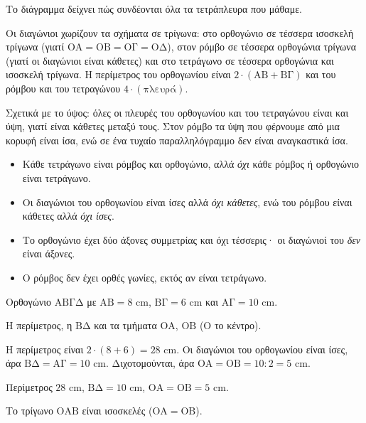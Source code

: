 Το διάγραμμα δείχνει πώς συνδέονται όλα τα τετράπλευρα που μάθαμε.

\begin{center}
\end{center}

Οι διαγώνιοι χωρίζουν τα σχήματα σε τρίγωνα: στο ορθογώνιο σε τέσσερα ισοσκελή τρίγωνα (γιατί $\mathrm{ΟΑ}=\mathrm{ΟΒ}=\mathrm{ΟΓ}=\mathrm{ΟΔ}$), στον ρόμβο σε τέσσερα ορθογώνια τρίγωνα (γιατί οι διαγώνιοι είναι κάθετες) και στο τετράγωνο σε τέσσερα ορθογώνια και ισοσκελή τρίγωνα. Η περίμετρος του ορθογωνίου είναι $2\cdot(\mathrm{ΑΒ}+\mathrm{ΒΓ})$ και του ρόμβου και του τετραγώνου $4\cdot(\text{πλευρά})$.

Σχετικά με το ύψος: όλες οι πλευρές του ορθογωνίου και του τετραγώνου είναι και ύψη, γιατί είναι κάθετες μεταξύ τους. Στον ρόμβο τα ύψη που φέρνουμε από μια κορυφή είναι ίσα, ενώ σε ένα τυχαίο παραλληλόγραμμο δεν είναι αναγκαστικά ίσα.

\begin{prosoxi}
\begin{itemize}[leftmargin=1.2em,itemsep=0.3ex,topsep=2pt]
\item Κάθε τετράγωνο είναι ρόμβος και ορθογώνιο, αλλά \emph{όχι} κάθε ρόμβος ή ορθογώνιο είναι τετράγωνο.
\item Οι διαγώνιοι του ορθογωνίου είναι ίσες αλλά \emph{όχι κάθετες}, ενώ του ρόμβου είναι κάθετες αλλά \emph{όχι ίσες}.
\item Το ορθογώνιο έχει δύο άξονες συμμετρίας και όχι τέσσερις· οι διαγώνιοί του \emph{δεν} είναι άξονες.
\item Ο ρόμβος δεν έχει ορθές γωνίες, εκτός αν είναι τετράγωνο.
\end{itemize}
\end{prosoxi}


\tixero Ορθογώνιο $\mathrm{ΑΒΓΔ}$ με $\mathrm{ΑΒ}=8$ cm, $\mathrm{ΒΓ}=6$ cm και $\mathrm{ΑΓ}=10$ cm.\par
\tithelo Η περίμετρος, η $\mathrm{ΒΔ}$ και τα τμήματα $\mathrm{ΟΑ}$, $\mathrm{ΟΒ}$ ($\mathrm{Ο}$ το κέντρο).\par
\possindeo Η περίμετρος είναι $2\cdot(8+6)=28$ cm. Οι διαγώνιοι του ορθογωνίου είναι ίσες, άρα $\mathrm{ΒΔ}=\mathrm{ΑΓ}=10$ cm. Διχοτομούνται, άρα $\mathrm{ΟΑ}=\mathrm{ΟΒ}=10:2=5$ cm.\par
\apantisi Περίμετρος $28$ cm, $\mathrm{ΒΔ}=10$ cm, $\mathrm{ΟΑ}=\mathrm{ΟΒ}=5$ cm.\par
\elegxos Το τρίγωνο $\mathrm{ΟΑΒ}$ είναι ισοσκελές ($\mathrm{ΟΑ}=\mathrm{ΟΒ}$).

